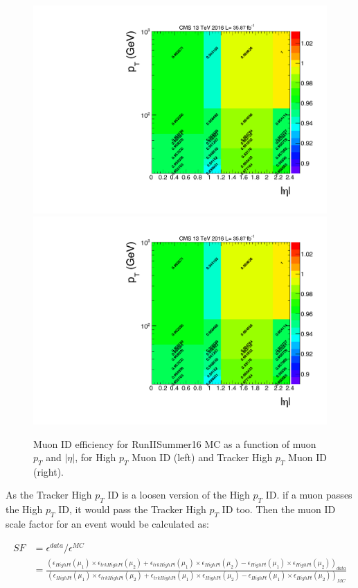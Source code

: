 \begin{figure}[htbp]
\begin{center}
\includegraphics[width=0.49\linewidth, page=5]{figures/bg_muonidisoeff.pdf}
\includegraphics[width=0.49\linewidth, page=6]{figures/bg_muonidisoeff.pdf}
\caption{Muon ID efficiency for RunIISummer16 MC as a function of muon $p_T$ and $|\eta|$, for High $p_T$ Muon ID (left) and Tracker High $p_T$ Muon ID (right).}
\label{fig:bg_muonmcideff}
\end{center}
\end{figure}

\vspace{0.3cm}
As the Tracker High $p_T$ ID is a loosen version of the High $p_T$ ID. if a muon passes the High $p_T$ ID, it would pass the Tracker High $p_T$ ID too. Then the muon ID scale factor for an event would be calculated as:
\begin{small}
\begin{align*}
SF & =\epsilon^{data}/\epsilon^{MC} \\
 & =\frac{(\epsilon_{HighPt}(\mu_1)\times \epsilon_{trkHighPt}(\mu_2)+\epsilon_{trkHighPt}(\mu_1)\times \epsilon_{HighPt}(\mu_2)-\epsilon_{HighPt}(\mu_1)\times \epsilon_{HighPt}(\mu_2))_{data}}{(\epsilon_{HighPt}(\mu_1)\times \epsilon_{trkHighPt}(\mu_2)+\epsilon_{trkHighPt}(\mu_1)\times \epsilon_{HighPt}(\mu_2)-\epsilon_{HighPt}(\mu_1)\times \epsilon_{HighPt}(\mu_2))_{MC}}
\end{align*}
\end{small}

